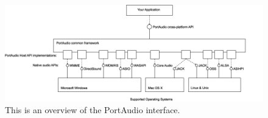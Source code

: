\begin{figure}[htb]
	\begin{center}
	\includegraphics[scale=0.44,trim=0 0 0 0]{content/graphics/appendix/portaudio_architecture.png}%
	\caption{This is an overview of the PortAudio interface.}
	\label{fig:app_portaudio}
	\end{center}
\end{figure}
